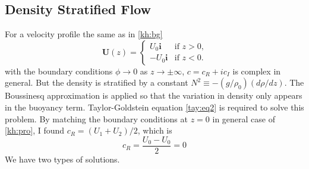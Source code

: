 \subsection{Density Stratified Flow}
For a velocity profile the same as in \eqref{kh:bg}
\begin{equation*}
\mathbf{U}(z) =
\begin{cases} U_0 \mathbf{i} &\text{if $z>0$,}\\
-U_0 \mathbf{i} &\text{if $z<0$.}
\end{cases}
\end{equation*}
with the boundary conditions $\phi \to 0$ as $z \to \pm\infty$,
$c=c_R+ic_I$ is complex in general. But the density is stratified by
a constant $N^2\equiv-(g/\rho_0)(d\rho/dz)$. The Boussinesq
approximation is applied so that the variation in density only
appears in the buoyancy term.
\newslide
Taylor-Goldstein equation \eqref{tay:eq2} is required to solve this
problem. By matching the boundary conditions at $z=0$ in general
case of \eqref{kh:pro}, I found $c_R=(U_1+U_2)/2$, which is
\begin{equation}\label{str:cr}
    c_R=\frac{U_0-U_0}{2}=0
\end{equation}
We have two types of solutions.
\newslide
